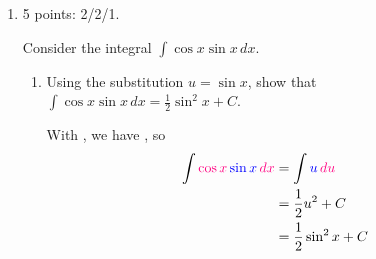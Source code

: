 \documentclass{article}
\begin{document}
\begin{enumerate}
\begin{enumerate}
        \begin{solution} %
          Here, it works better to substitute 
          because we see something related to $du = 2e^{2x} \, dx$ in
          the integral, namely . So,
          \begin{align*}
            \int \frac{\subd{e^{2x}}}{\sub{e^{2x} + 1}} \, \subd{dx} &=
            \int \frac{1}{\sub{u}} \cdot \subd{\frac{du}{2}} \\
            &= \frac{1}{2} \int \frac{1}{u} \, du \\
            &= \frac{1}{2} \ln |u| + C \\
            &= \boxed{\frac{1}{2} \ln \left|e^{2x} + 1 \right| + C}
          \end{align*}
          Note that $e^{2x} + 1$ is always positive, so we can also
          rewrite this as simply $\frac{1}{2} \ln \left|e^{2x} + 1
          \right| + C$.  Let's check that this is right by
          differentiating it:
          \[ \frac{d}{dx} \left(\frac{1}{2}
            \fcolorbox{red}{white}{$\displaystyle
              \ln\left(\fcolorbox{blue}{white}{$\displaystyle e^ { 2 x}
                  + 1$}\right)$}\right) = \frac{1}{2}\cdot \frac{1}{e^ {
              2 x} + 1}\cdot 2 e^{2x} = \frac{e^{2x}}{e^{2x} + 1}
          \checkmark\]
        \end{solution}

      \end{enumerate}

      \pspace{\newpage}

\item 

\begin{grading}
5 points: 2/2/1.
\end{grading}

 Consider the integral $\displaystyle \int \cos x \sin x\,dx$.

    \begin{enumerate}[topsep=0pt]

    \item
      \begin{problem}[\vfill]
        Using the substitution $u=\sin x$, show that $\displaystyle \int
        \cos x \sin x\,dx=\frac{1}{2} \sin^2x +C$.
      \end{problem}

      \begin{solution} %
        With , we have , so
        \begin{align*}
          \int \subd{\cos x} \, \sub{\sin x} \, \subd{dx} &= \int
          \sub{u} \, \subd{du} \\ 
          &= \frac{1}{2} u^2 + C \\
          &= \frac{1}{2} \sin^2 x + C
        \end{align*}
      \end{solution}


\end{enumerate}
\end{enumerate}
\end{document}
